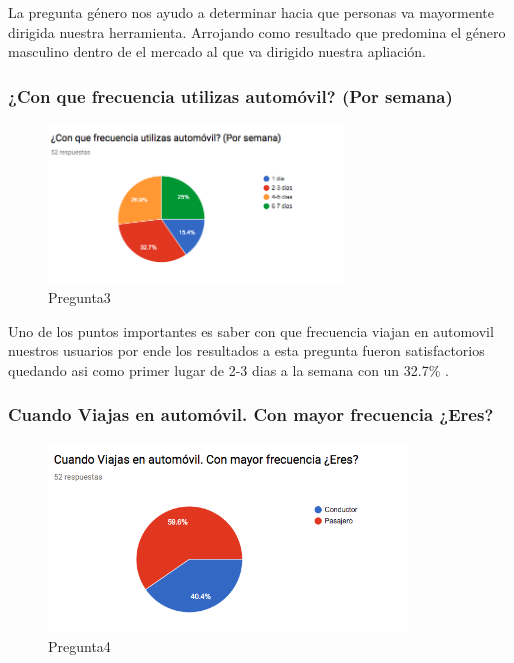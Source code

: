 La pregunta género nos ayudo a determinar hacia que personas va mayormente dirigida nuestra herramienta. Arrojando como resultado que predomina el género masculino dentro de el mercado al que va dirigido nuestra apliación.\\

\subsubsection{¿Con que frecuencia utilizas automóvil? (Por semana)}

\begin{figure}[htbp!]
	\begin{center}
		\includegraphics[width=0.7\textwidth]{DisenoEstructura/imagenes/Pregunta3}
		\caption{Pregunta3}
		\label{DE/FO/Pregunta3}
	\end{center}
\end{figure}

Uno de los puntos importantes es saber con que frecuencia viajan en automovil nuestros usuarios por ende los resultados a esta pregunta fueron satisfactorios quedando asi como primer lugar de 2-3 dias a la semana con un 32.7\% . \\

\subsubsection{Cuando Viajas en automóvil. Con mayor frecuencia ¿Eres?}

\begin{figure}[htbp!]
	\begin{center}
		\includegraphics[width=0.85\textwidth]{DisenoEstructura/imagenes/Pregunta4}
		\caption{Pregunta4}
		\label{DE/FO/Pregunta4}
	\end{center}
\end{figure}

